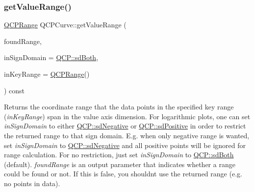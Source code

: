 \mbox{\label{class_q_c_p_curve_a8bb8e3b9085f15921dc40483fb025ab2}} 
\subsubsection{\texorpdfstring{get\+Value\+Range()}{getValueRange()}}
{\footnotesize\ttfamily \hyperlink{class_q_c_p_range}{Q\+C\+P\+Range} Q\+C\+P\+Curve\+::get\+Value\+Range (\begin{DoxyParamCaption}\item[{bool \&}]{found\+Range,  }\item[{\hyperlink{namespace_q_c_p_afd50e7cf431af385614987d8553ff8a9}{Q\+C\+P\+::\+Sign\+Domain}}]{in\+Sign\+Domain = {\ttfamily \hyperlink{namespace_q_c_p_afd50e7cf431af385614987d8553ff8a9aa38352ef02d51ddfa4399d9551566e24}{Q\+C\+P\+::sd\+Both}},  }\item[{const \hyperlink{class_q_c_p_range}{Q\+C\+P\+Range} \&}]{in\+Key\+Range = {\ttfamily \hyperlink{class_q_c_p_range}{Q\+C\+P\+Range}()} }\end{DoxyParamCaption}) const\hspace{0.3cm}{\ttfamily [virtual]}}

Returns the coordinate range that the data points in the specified key range ({\itshape in\+Key\+Range}) span in the value axis dimension. For logarithmic plots, one can set {\itshape in\+Sign\+Domain} to either \hyperlink{namespace_q_c_p_afd50e7cf431af385614987d8553ff8a9a2d18af0bc58f6528d1e82ce699fe4829}{Q\+C\+P\+::sd\+Negative} or \hyperlink{namespace_q_c_p_afd50e7cf431af385614987d8553ff8a9a584784b75fb816abcc627cf743bb699f}{Q\+C\+P\+::sd\+Positive} in order to restrict the returned range to that sign domain. E.\+g. when only negative range is wanted, set {\itshape in\+Sign\+Domain} to \hyperlink{namespace_q_c_p_afd50e7cf431af385614987d8553ff8a9a2d18af0bc58f6528d1e82ce699fe4829}{Q\+C\+P\+::sd\+Negative} and all positive points will be ignored for range calculation. For no restriction, just set {\itshape in\+Sign\+Domain} to \hyperlink{namespace_q_c_p_afd50e7cf431af385614987d8553ff8a9aa38352ef02d51ddfa4399d9551566e24}{Q\+C\+P\+::sd\+Both} (default). {\itshape found\+Range} is an output parameter that indicates whether a range could be found or not. If this is false, you shouldn\textquotesingle{}t use the returned range (e.\+g. no points in data).


